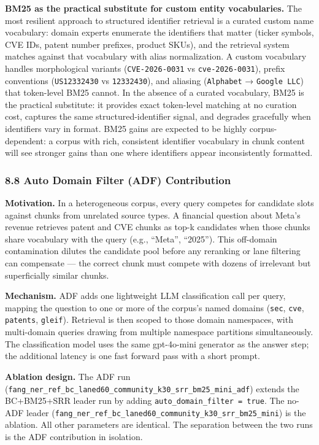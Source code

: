 \documentclass[
]{article}
\begin{document}
\textbf{BM25 as the practical substitute for custom entity
vocabularies.} The most resilient approach to structured identifier
retrieval is a curated custom name vocabulary: domain experts enumerate
the identifiers that matter (ticker symbols, CVE IDs, patent number
prefixes, product SKUs), and the retrieval system matches against that
vocabulary with alias normalization. A custom vocabulary handles
morphological variants (\texttt{CVE-2026-0031} vs
\texttt{cve-2026-0031}), prefix conventions (\texttt{US12332430} vs
\texttt{12332430}), and aliasing (\texttt{Alphabet} →
\texttt{Google\ LLC}) that token-level BM25 cannot. In the absence of a
curated vocabulary, BM25 is the practical substitute: it provides exact
token-level matching at no curation cost, captures the same
structured-identifier signal, and degrades gracefully when identifiers
vary in format. BM25 gains are expected to be highly corpus-dependent: a
corpus with rich, consistent identifier vocabulary in chunk content will
see stronger gains than one where identifiers appear inconsistently
formatted.

\subsubsection{8.8 Auto Domain Filter (ADF)
Contribution}\label{auto-domain-filter-adf-contribution}

\textbf{Motivation.} In a heterogeneous corpus, every query competes for
candidate slots against chunks from unrelated source types. A financial
question about Meta's revenue retrieves patent and CVE chunks as top-k
candidates when those chunks share vocabulary with the query (e.g.,
``Meta'', ``2025''). This off-domain contamination dilutes the candidate
pool before any reranking or lane filtering can compensate --- the
correct chunk must compete with dozens of irrelevant but superficially
similar chunks.

\textbf{Mechanism.} ADF adds one lightweight LLM classification call per
query, mapping the question to one or more of the corpus's named domains
(\texttt{sec}, \texttt{cve}, \texttt{patents}, \texttt{gleif}).
Retrieval is then scoped to those domain namespaces, with multi-domain
queries drawing from multiple namespace partitions simultaneously. The
classification model uses the same gpt-4o-mini generator as the answer
step; the additional latency is one fast forward pass with a short
prompt.

\textbf{Ablation design.} The ADF run
(\texttt{fang\_ner\_ref\_bc\_laned60\_community\_k30\_srr\_bm25\_mini\_adf})
extends the BC+BM25+SRR leader run by adding
\texttt{auto\_domain\_filter\ =\ true}. The no-ADF leader
(\texttt{fang\_ner\_ref\_bc\_laned60\_community\_k30\_srr\_bm25\_mini})
is the ablation. All other parameters are identical. The separation
between the two runs is the ADF contribution in isolation.
\end{document}
